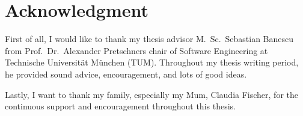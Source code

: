 \newpage
\thispagestyle{empty}
\section*{Acknowledgment}
First of all, I would like to thank my thesis advisor M.~Sc.~Sebastian Banescu from Prof.~Dr.~Alexander Pretschners chair of Software Engineering at Technische Universit{\"a}t M{\"u}nchen (TUM). Throughout my thesis writing period, he provided sound advice, encouragement, and lots of good ideas.

\bigskip

Lastly, I want to thank my family, especially my Mum, Claudia Fischer, for the continuous support and encouragement throughout this thesis.